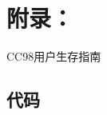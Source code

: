 \section{附录：}
\begin{thebibliography}{99} 
    \kaishu 
    CC98用户生存指南
    \songti
\end{thebibliography}
\subsection*{代码}


